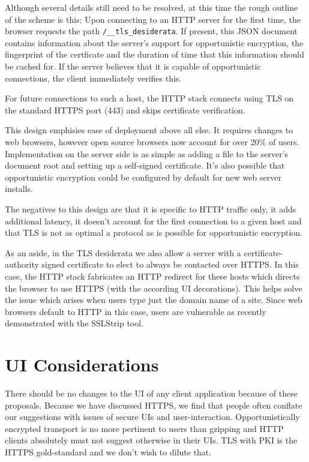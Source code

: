 \documentclass[conference]{IEEEtran}
\begin{document}
Although several details still need to be resolved, at this time the rough
outline of the scheme is this: Upon connecting to an HTTP server for the first
time, the browser requests the path {\tt /\_\_tls\_desiderata}. If present,
this JSON\cite{rfc4627} document contains information about the server's support for
opportunistic encryption, the fingerprint of the certficate and the duration of
time that this information should be cached for. If the server believes that it
is capable of opportunistic connections, the client immediately verifies this.

For future connections to such a host, the HTTP stack connects using TLS on the
standard HTTPS port (443) and skips certificate verification.

This design emphisies ease of deployment above all else. It requires changes to
web browsers, however open source browsers now account for over 20\% of
users\cite{netapp}. Implementation on the server side is as simple as adding a file to
the server's document root and setting up a self-signed certificate. It's also
possible that opportunistic encryption could be configured by default for new
web server installs.

The negatives to this design are that it is specific to HTTP traffic only, it
adds additional latency, it doesn't account for the first connection to a given
host and that TLS is not as optimal a protocol as is possible for opportunistic
encryption.

As an aside, in the TLS desiderata we also allow a server with a
certificate-authority signed certificate to elect to always be contacted over
HTTPS. In this case, the HTTP stack fabricates an HTTP redirect for these hosts
which directs the browser to use HTTPS (with the according UI decorations).
This helps solve the issue which arises when users type just the domain name of
a site. Since web browsers default to HTTP in this case, users are vulnerable
as recently demonstrated with the SSLStrip tool\cite{sslstrip}.

\section{UI Considerations}

There should be no changes to the UI of any client application because of these
proposals. Because we have discussed HTTPS, we find that people often conflate
our suggestions with issues of secure UIs and user-interaction.
Opportunistically encrypted transport is no more pertinent to users than
gzipping and HTTP clients absolutely must not suggest otherwise in their UIs.
TLS with PKI is the HTTPS gold-standard and we don't wish to dilute that.
\end{document}

